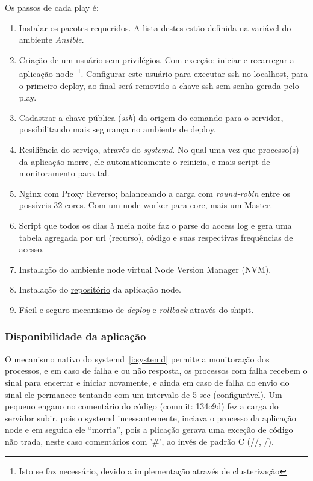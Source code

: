 Os passos de cada play é:
\begin{enumerate}
     \item Instalar os pacotes requeridos. A lista destes estão
     definida na variável do ambiente \emph{Ansible}.
     \item Criação de um usuário sem privilégios. Com exceção: iniciar e
     recarregar a aplicação node~\footnote{Isto se faz 
     necessário, devido a implementação através de
     clusterização}. Configurar este usuário para executar ssh no
   localhost, para o primeiro deploy, ao final será removido a chave
   ssh sem senha gerada pelo play.
    \item Cadastrar a chave pública (\emph{ssh}) da origem do comando
      para o servidor, possibilitando mais segurança no ambiente de deploy.
    \item Resiliência do serviço, através do \emph{systemd}. No qual
        uma vez que processo(s) da aplicação morre, ele automaticamente
        o reinicia, e mais script de monitoramento para tal. \label{i:systemd}
    \item Nginx com Proxy Reverso; balanceando a carga com
      \emph{round-robin} entre os possíveis 32 cores. Com um node
      worker para core, mais um Master. \label{i:nginx}
    \item Script que todos os dias à meia noite faz o parse do access
      log e gera uma tabela agregada por url (recurso), código e suas
      respectivas frequências de acesso.
    \item Instalação do ambiente node virtual Node Version Manager
      (NVM).
    \item Instalação do
      \href{https://github.com/alessandro11/desafio-2.git}{repositório}
      da aplicação node.
    \item Fácil e seguro mecanismo de \emph{deploy} e \emph{rollback}
      através do shipit.
\end{enumerate}


\subsubsection{Disponibilidade da aplicação}
O mecanismo nativo do systemd~\ref{i:systemd} permite a monitoração dos
processos, e em caso de falha e ou não resposta, os processos com falha recebem o sinal para
encerrar e iniciar novamente, e ainda em caso de falha do envio do
sinal ele permanece tentando com um intervalo de 5 sec
(configurável). Um pequeno engano no comentário do código (commit:
134c9d) fez a carga do servidor subir, pois o systemd incessantemente,
inciava o processo da aplicação node e em seguida ele ``morria'', pois
a plicação gerava uma exceção de código não trada, neste caso
comentários com '\#', ao invés de padrão C (//,
/\textasteriskcentered\textasteriskcentered).

